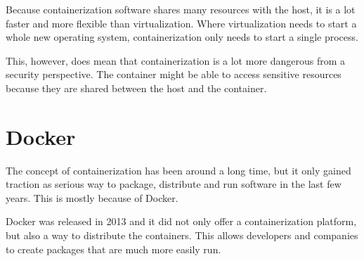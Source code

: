 \hfill

Because containerization software shares many resources with the host, it is a lot faster and more flexible than virtualization. Where virtualization needs to start a whole new operating system, containerization only needs to start a single process.

\hfill

This, however, does mean that containerization is a lot more dangerous from a security perspective. The container might be able to access sensitive resources because they are shared between the host and the container.

\section{Docker}

\hfill


\hfill

The concept of containerization has been around a long time, but it only gained traction as serious way to package, distribute and run software in the last few years. This is mostly because of Docker.

\hfill

Docker was released in 2013 and it did not only offer a containerization platform, but also a way to distribute the containers. This allows developers and companies to create packages that are much more easily run.

\hfill

